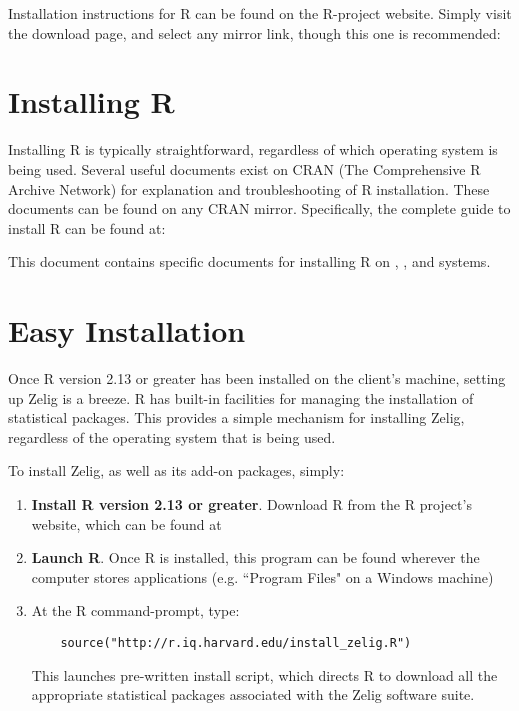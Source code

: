 Installation instructions for R can be found on the R-project website. Simply visit the download page, and select any mirror link, though this one is recommended:

\CranMirror



%
%
\section{Installing R}

Installing R is typically straightforward, regardless of which operating system is being used. Several useful documents exist on CRAN (The Comprehensive R Archive Network) for explanation and troubleshooting of R installation. These documents can be found on any CRAN mirror. Specifically, the complete guide to install R can be found at:

\InstallInstructionsHref

This document contains specific documents for installing R on \MacInstallHref, \WindowsInstallHref, and \UnixInstallHref systems.

%
%
\section{Easy Installation}

Once R version 2.13 or greater has been installed on the client's machine, setting up Zelig is a breeze. R has built-in facilities for managing the installation of statistical packages. This provides a simple mechanism for installing Zelig, regardless of the operating system that is being used.

To install Zelig, as well as its add-on packages, simply:

\begin{enumerate}
	\item {\bf Install R version 2.13 or greater}. Download R from the R project's website, which can be found at \CranMirror
  \item {\bf Launch R}. Once R is installed, this program can be found wherever the computer stores applications (e.g. ``Program Files" on a Windows machine)
  \item At the R command-prompt, type:
    \begin{verbatim}
    source("http://r.iq.harvard.edu/install_zelig.R")
    \end{verbatim}
    This launches pre-written install script, which directs R to download all the appropriate statistical packages associated with the Zelig software suite.
\end{enumerate}



